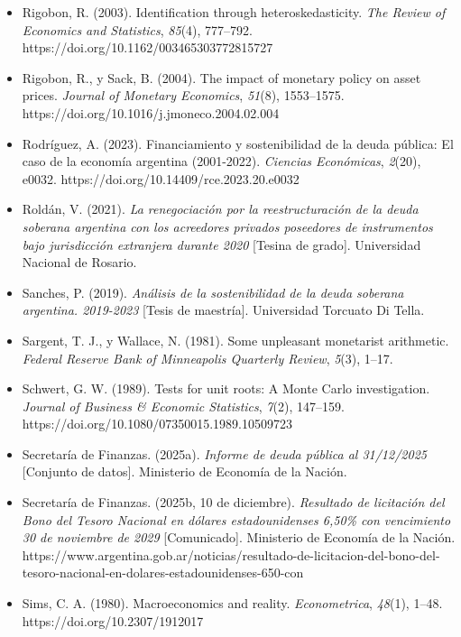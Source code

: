 \begin{itemize}[label={},leftmargin=1.27cm,itemindent=-1.27cm,itemsep=0.6\baselineskip]
{  and monetary policy independence} {[}Ponencia{]}. Economic Policy
  Symposium, Federal Reserve Bank of Kansas City, Jackson Hole, Wyoming,
  Estados Unidos.
\item
  Rigobon, R. (2003). Identification through heteroskedasticity.
  \emph{The Review of Economics and Statistics}, \emph{85}(4), 777--792.
  https://doi.org/10.1162/003465303772815727
\item
  Rigobon, R., y Sack, B. (2004). The impact of monetary policy on asset
  prices. \emph{Journal of Monetary Economics}, \emph{51}(8),
  1553--1575. https://doi.org/10.1016/j.jmoneco.2004.02.004
\item
  Rodríguez, A. (2023). Financiamiento y sostenibilidad de la deuda
  pública: El caso de la economía argentina (2001-2022). \emph{Ciencias
  Económicas}, \emph{2}(20), e0032.
  https://doi.org/10.14409/rce.2023.20.e0032
\item
  Roldán, V. (2021). \emph{La renegociación por la reestructuración de
  la deuda soberana argentina con los acreedores privados poseedores de
  instrumentos bajo jurisdicción extranjera durante 2020} {[}Tesina de
  grado{]}. Universidad Nacional de Rosario.
\item
  Sanches, P. (2019). \emph{Análisis de la sostenibilidad de la deuda
  soberana argentina. 2019-2023} {[}Tesis de maestría{]}. Universidad
  Torcuato Di Tella.
\item
  Sargent, T. J., y Wallace, N. (1981). Some unpleasant monetarist
  arithmetic. \emph{Federal Reserve Bank of Minneapolis Quarterly
  Review}, \emph{5}(3), 1--17.
\item
  Schwert, G. W. (1989). Tests for unit roots: A Monte Carlo
  investigation. \emph{Journal of Business \& Economic Statistics},
  \emph{7}(2), 147--159. https://doi.org/10.1080/07350015.1989.10509723
\item
  Secretaría de Finanzas. (2025a). \emph{Informe de deuda pública al
  31/12/2025} {[}Conjunto de datos{]}. Ministerio de Economía de la
  Nación.
\item
  Secretaría de Finanzas. (2025b, 10 de diciembre). \emph{Resultado de
  licitación del Bono del Tesoro Nacional en dólares estadounidenses
  6,50\% con vencimiento 30 de noviembre de 2029} {[}Comunicado{]}.
  Ministerio de Economía de la Nación.
  https://www.argentina.gob.ar/noticias/resultado-de-licitacion-del-bono-del-tesoro-nacional-en-dolares-estadounidenses-650-con
\item
  Sims, C. A. (1980). Macroeconomics and reality. \emph{Econometrica},
  \emph{48}(1), 1--48. https://doi.org/10.2307/1912017

\end{itemize}
